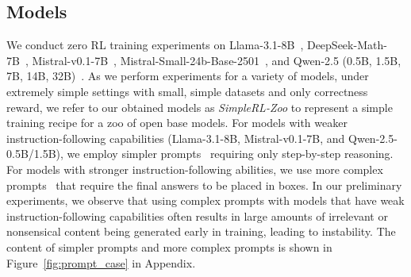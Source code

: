 \subsection{Models} 
We conduct zero RL training experiments on Llama-3.1-8B~\citep{dubey2024llama}, DeepSeek-Math-7B~\citep{shao2024deepseekmath}, Mistral-v0.1-7B~\citep{jiang2023mistral7b}, Mistral-Small-24b-Base-2501~\citep{mistral2024small}, and Qwen-2.5 (0.5B, 1.5B, 7B, 14B, 32B)~\citep{yang2024qwen2}.
As we perform experiments for a variety of models, under extremely simple settings with small, simple datasets and only correctness reward, we refer to our obtained models as \emph{SimpleRL-Zoo} to represent a simple training recipe for a zoo of open base models.
For models with weaker instruction-following capabilities (Llama-3.1-8B, Mistral-v0.1-7B, and Qwen-2.5-0.5B/1.5B), we employ simpler prompts~\citep{abel} requiring only step-by-step reasoning. For models with stronger instruction-following abilities, we use more complex prompts~\citep{yang2024qwen2} that require the final answers to be placed in boxes. In our preliminary experiments, we observe that using complex prompts with models that have weak instruction-following capabilities often results in large amounts of irrelevant or nonsensical content being generated early in training, leading to instability.
The content of simpler prompts and more complex prompts is shown in Figure~\ref{fig:prompt_case} in Appendix.



